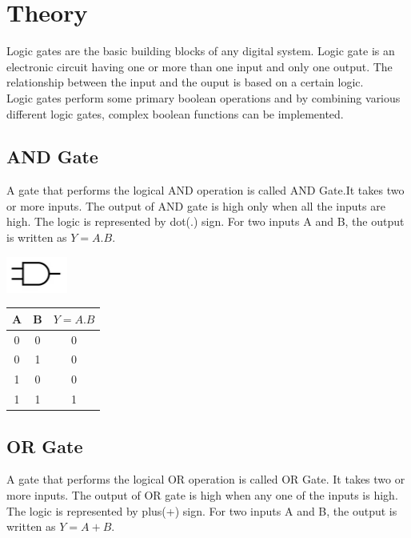 \documentclass[a4paper, 12pt]{article}
\begin{document}
\section{Theory}
Logic gates are the basic building blocks of any digital system. Logic gate is an electronic circuit having one or more than one input and only one output. The relationship between the input and the ouput is based on a certain logic. \\
Logic gates perform some primary boolean operations and by combining various different logic gates, complex boolean functions can be implemented.


\subsection{AND Gate}
A gate that performs the logical AND operation is called AND Gate.It takes two or more inputs. The output of AND gate is high only when all the inputs are high. The logic is represented by dot(.) sign. For two inputs A and B, the output is written as $Y = A.B$.

\begin{minipage}[c]{.5\textwidth}
  \centering
    \includegraphics{and-gate}
\end{minipage}
\begin{minipage}{.5\textwidth}
  \begin{center}
    \begin{tabular}{ |c|c|c| }
      \hline
      A & B & $Y = A.B$ \\
      \hline
      0 & 0 & 0 \\
      \hline
      0 & 1 & 0 \\
      \hline
      1 & 0 & 0 \\
      \hline
      1 & 1 & 1 \\
      \hline
    \end{tabular}
  \end{center}
\end{minipage}


\subsection{OR Gate}
A gate that performs the logical OR operation is called OR Gate. It takes two or more inputs. The output of OR gate is high when any one of the inputs is high. The logic is represented by plus(+) sign. For two inputs A and B, the output is written as $Y = A + B$.
\end{document}
